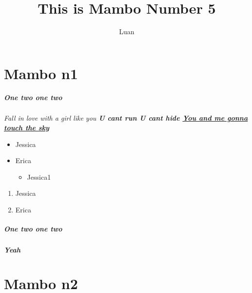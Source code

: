 \documentclass[11pt, a4paper]{article}
\title{This is Mambo Number 5}
\author{Luan}
\begin{document}
\maketitle

\chapter{Mambo n1}
\paragraph{One two one two}
\it{Fall in love with a girl like you}
\bf{U cant run U cant hide}
\underline{You and me gonna touch the sky}

\begin{itemize}
\item{Jessica}
\item{Erica}
\begin{itemize}
\item{Jessica1}
\end{itemize}
\end{itemize}

\begin{enumerate}
\item{Jessica}
\item{Erica}
\end{enumerate}

\paragraph{One two one two}
\paragraph{Yeah}

\chapter{Mambo n2}
\end{document}
